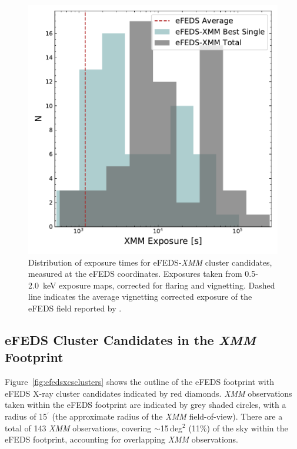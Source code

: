 \documentclass[fleqn,usenatbib]{mnras}
\begin{document}
\begin{figure}
    \centering
    \includegraphics[width=0.95\columnwidth]{images/xmm_exposures.pdf}
    \caption[]{Distribution of exposure times for eFEDS-{\em XMM} cluster candidates, measured at the eFEDS coordinates. Exposures taken from 0.5-2.0~keV exposure maps, corrected for flaring and vignetting. Dashed line indicates the average vignetting corrected exposure of the eFEDS field reported by \cite{efedsclustercat}.}
    \label{fig:xmmexposure}
\end{figure}

\subsection{eFEDS Cluster Candidates in the {\em XMM} Footprint}
\label{sec:eFEDS-XMM}

Figure~\ref{fig:efedsxcsclusters} shows the outline of the eFEDS footprint with eFEDS X-ray cluster candidates \citep{efedsclustercat} indicated by red diamonds. {\em XMM} observations taken within the eFEDS footprint are indicated by grey shaded circles, with a radius of 15$^{\prime}$ (the approximate radius of the {\em XMM} field-of-view). There are a total of 143 {\em XMM} observations, covering ${\sim}$15\,deg$^{2}$ (11\%) of the sky within the eFEDS footprint, accounting for overlapping {\em XMM} observations.
\end{document}
